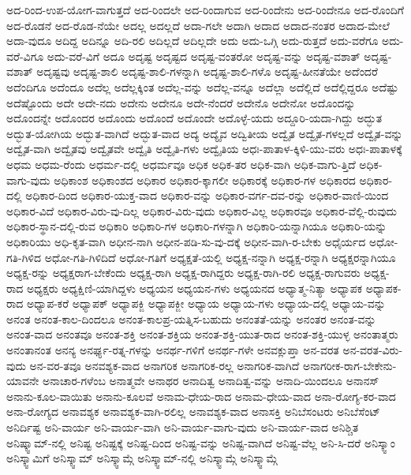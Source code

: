{ಅದ-ರಿಂದ-ಉಪ-ಯೋಗ-ವಾಗುತ್ತದೆ
ಅದ-ರಿಂದಲೇ
ಅದ-ರಿಂದಾಗುವ
ಅದ-ರಿಂದೇನು
ಅದ-ರಿಂದೇನೂ
ಅದ-ರೊಂದಿಗೆ
ಅದ-ರೊಡನೆ
ಅದ-ರೊಡ-ನೆಯೇ
ಅದಲ್ಲ
ಅದಲ್ಲದೆ
ಅದಾ-ಗಲೇ
ಅದಾಗಿ
ಅದಾದ
ಅದಾದ-ನಂತರ
ಅದಾದ-ಮೇಲೆ
ಅದಾ-ವುದೂ
ಅದಿದ್ದ
ಅದಿನ್ನೂ
ಅದಿ-ರಲಿ
ಅದಿಲ್ಲದೆ
ಅದಿಲ್ಲದೇ
ಅದು
ಅದು-ಒಗ್ಗಿ
ಅದು-ರುತ್ತದೆ
ಅದು-ವರೆಗೂ
ಅದು-ವರೆ-ವಿಗೂ
ಅದು-ವರೆ-ವಿಗೆ
ಅದೂ
ಅದೃಷ್ಟ
ಅದೃಷ್ಟದ
ಅದೃಷ್ಟ-ವಂತರೋ
ಅದೃಷ್ಟ-ವನ್ನು
ಅದೃಷ್ಟ-ವಶಾತ್
ಅದೃಷ್ಟ-ವಶಾತ್
ಅದೃಷ್ಟವು
ಅದೃಷ್ಟ-ಶಾಲಿ
ಅದೃಷ್ಟ-ಶಾಲಿ-ಗಳನ್ನಾಗಿ
ಅದೃಷ್ಟ-ಶಾಲಿ-ಗಳೊ
ಅದೃಷ್ಟ-ಹೀನತೆಯೇ
ಅದೆಂದರೆ
ಅದೆಂದಿಗೂ
ಅದೆಂದೂ
ಅದೆಲ್ಲ
ಅದೆಲ್ಲಕ್ಕಿಂತ
ಅದೆಲ್ಲ-ವನ್ನು
ಅದೆಲ್ಲ-ವನ್ನೂ
ಅದೆಲ್ಲಾ
ಅದೆಲ್ಲಿದೆ
ಅದೆಲ್ಲಿದ್ದರೂ
ಅದೆಷ್ಟು
ಅದೆಷ್ಟೊಂದು
ಅದೇ
ಅದೇ-ನದು
ಅದೇನು
ಅದೇನೂ
ಅದೇ-ನೆಂದರೆ
ಅದೇನೊ
ಅದೇನೋ
ಅದೊಂದನ್ನು
ಅದೊಂದನ್ನೇ
ಅದೊಂದರ
ಅದೊಂದು
ಅದೊಂದೆ
ಅದೊಂದೇ
ಅದೊಳ್ಳೆ-ಯದು
ಅದ್ದೂರಿ-ಯದಾ-ಗಿದ್ದು
ಅದ್ಭುತ
ಅದ್ಭುತ-ಯೋಗಿಯ
ಅದ್ಭುತ-ವಾಗಿದೆ
ಅದ್ಭುತ-ವಾದ
ಅದ್ಯ
ಅದ್ಯೈವ
ಅದ್ವಿತೀಯ
ಅದ್ವೈತ
ಅದ್ವೈತ-ಗಳಲ್ಲದೆ
ಅದ್ವೈತ-ವನ್ನು
ಅದ್ವೈತ-ವಾಗಿ
ಅದ್ವೈತವು
ಅದ್ವೈತವೇ
ಅದ್ವೈತಿ
ಅದ್ವೈತಿ-ಗಳು
ಅದ್ವೈತಿಯ
ಅಧಃ-ಪಾತಾಳ-ಕ್ಕಿಳಿ-ಯು-ವರು
ಅಧಃ-ಪಾತಾಳಕ್ಕೆ
ಅಧಮ
ಅಧಮ-ರೆಂದು
ಅಧರ್ಮ-ದಲ್ಲಿ
ಅಧರ್ಮವೂ
ಅಧಿಕ
ಅಧಿಕ-ತರ
ಅಧಿಕ-ವಾಗಿ
ಅಧಿಕ-ವಾಗು-ತ್ತಿದೆ
ಅಧಿಕ-ವಾಗು-ವುದು
ಅಧಿಕಾಂಶ
ಅಧಿಕಾಂಶದ
ಅಧಿಕಾರ
ಅಧಿಕಾರ-ಕ್ಕಾಗಲೀ
ಅಧಿಕಾರಕ್ಕೆ
ಅಧಿಕಾರ-ಗಳ
ಅಧಿಕಾರದ
ಅಧಿಕಾರ-ದಲ್ಲಿ
ಅಧಿಕಾರ-ದಿಂದ
ಅಧಿಕಾರ-ಯುಕ್ತ-ವಾದ
ಅಧಿಕಾರ-ವನ್ನು
ಅಧಿಕಾರ-ವರ್ಗ-ದವ-ರನ್ನು
ಅಧಿಕಾರ-ವಾಣಿ-ಯಿಂದ
ಅಧಿಕಾರ-ವಿದೆ
ಅಧಿಕಾರ-ವಿರು-ವು-ದಿಲ್ಲ
ಅಧಿಕಾರ-ವಿರು-ವುದು
ಅಧಿಕಾರ-ವಿಲ್ಲ
ಅಧಿಕಾರವೂ
ಅಧಿಕಾರ-ವೆಲ್ಲಿ-ರುವುದು
ಅಧಿಕಾರ-ಸ್ಥಾನ-ದಲ್ಲಿ-ರುವ
ಅಧಿಕಾರಿ
ಅಧಿಕಾರಿ-ಗಳ
ಅಧಿಕಾರಿ-ಗಳನ್ನಾಗಿ
ಅಧಿಕಾರಿ-ಯನ್ನಾಗಿಯೂ
ಅಧಿಕಾರಿ-ಯನ್ನು
ಅಧಿಕಾರಿಯು
ಅಧಿ-ಕೃತ-ವಾಗಿ
ಅಧೀನ-ನಾಗಿ
ಅಧೀನ-ಪಡಿ-ಸು-ವು-ದಕ್ಕೆ
ಅಧೀನ-ವಾಗಿ-ರ-ಬೇಕು
ಅಧೈರ್ಯದ
ಅಧೋ-ಗತಿ-ಗಿಳಿದ
ಅಧೋ-ಗತಿ-ಗಿಳಿದಿದೆ
ಅಧೋ-ಗತಿಗೆ
ಅಧ್ಯಕ್ಷತೆ-ಯಲ್ಲಿ
ಅಧ್ಯಕ್ಷ-ನನ್ನಾಗಿ
ಅಧ್ಯಕ್ಷ-ರನ್ನಾಗಿ
ಅಧ್ಯಕ್ಷರನ್ನಾಗಿಯೂ
ಅಧ್ಯಕ್ಷ-ರನ್ನು
ಅಧ್ಯಕ್ಷರಾಗ-ಬೇಕೆಂದು
ಅಧ್ಯಕ್ಷ-ರಾಗಿ
ಅಧ್ಯಕ್ಷ-ರಾಗಿದ್ದರು
ಅಧ್ಯಕ್ಷ-ರಾಗಿ-ರಲಿ
ಅಧ್ಯಕ್ಷ-ರಾಗುವರು
ಅಧ್ಯಕ್ಷ-ರಾದ
ಅಧ್ಯಕ್ಷರು
ಅಧ್ಯಕ್ಷಿಣಿ-ಯಾಗಿದ್ದಳು
ಅಧ್ಯಯನ
ಅಧ್ಯಯನ-ಗಳು
ಅಧ್ಯಯನದ
ಅಧ್ಯಾತ್ಮ-ನಿತ್ಯಾ
ಅಧ್ಯಾಪಕ
ಅಧ್ಯಾಪಕ-ರಾದ
ಅಧ್ಯಾಪ-ಕರೆ
ಅಧ್ಯಾಪಕ್
ಅಧ್ಯಾಪಕ್ಜಿ
ಅಧ್ಯಾಪಕ್ಜೀ
ಅಧ್ಯಾಯ
ಅಧ್ಯಾಯ-ಗಳು
ಅಧ್ಯಾಯ-ದಲ್ಲಿ
ಅಧ್ಯಾಯ-ವನ್ನು
ಅನಂತ
ಅನಂತ-ಕಾಲ-ದಿಂದಲೂ
ಅನಂತ-ಕಾಲಪ್ರ-ಯತ್ನಿಸ-ಬಹುದು
ಅನಂತತೆ-ಯನ್ನು
ಅನಂತರ
ಅನಂತ-ವನ್ನು
ಅನಂತ-ವಾದ
ಅನಂತವೂ
ಅನಂತ-ಶಕ್ತಿ
ಅನಂತ-ಶಕ್ತಿಯ
ಅನಂತ-ಶಕ್ತಿ-ಯುತ-ರಾದ
ಅನಂತ-ಶಕ್ತಿ-ಯುಳ್ಳ
ಅನಂತಾತ್ಮರು
ಅನಂತಾನಂತ
ಅನನ್ಯ
ಅನರ್ಘ್ಯ-ರತ್ನ-ಗಳನ್ನು
ಅನರ್ಥ-ಗಳಿಗೆ
ಅನರ್ಥ-ಗಳೇ
ಅನವಕ್ಲುಪ್ತಾ
ಅನ-ವರತ
ಅನ-ವರತ-ವಿರು-ವುದು
ಅನ-ವರ-ತವೂ
ಅನವಶ್ಯಕ-ವಾದ
ಅನಾಗರಿಕ
ಅನಾಗರಿಕ-ರಲ್ಲ
ಅನಾಗರಿಕ-ವಾಗಿದೆ
ಅನಾಗರೀಕ-ರಾಗ-ಬೇಕೇನು-ಯಾವನೇ
ಅನಾಚಾರ-ಗಳೆಂಬ
ಅನಾತ್ಮವೇ
ಅನಾಥರ
ಅನಾದಿತ್ವ
ಅನಾದಿತ್ವ-ವನ್ನು
ಅನಾದಿ-ಯಿಂದಲೂ
ಅನಾನಸ್
ಅನಾನು-ಕೂಲ-ವಾಯಿತು
ಅನಾನು-ಕೂಲವೆ
ಅನಾಮ-ಧೇಯ-ರಾದ
ಅನಾಮ-ಧೇಯ-ವಾದ
ಅನಾ-ರೋಗ್ಯ-ಕರ-ವಾದ
ಅನಾ-ರೋಗ್ಯದ
ಅನಾವಶ್ಯಕ
ಅನಾವಶ್ಯಕ-ವಾಗಿ-ರಲಿಲ್ಲ
ಅನಾವಶ್ಯಕ-ವಾದ
ಅನಾಸಕ್ತಿ
ಅನಿಬೆಸಂಟರು
ಅನಿಬೆಸೆಂಟ್
ಅನಿರ್ದಿಷ್ಟ
ಅನಿ-ವಾರ್ಯ
ಅನಿ-ವಾರ್ಯ-ವಾಗಿ
ಅನಿ-ವಾರ್ಯ-ವಾಗು-ವುದು
ಅನಿ-ವಾರ್ಯ-ವಾದ
ಅನಿಶ್ಚಿತ
ಅನಿಷ್ಕ್ವಾಮ್-ನಲ್ಲಿ
ಅನಿಷ್ಟ
ಅನಿಷ್ಟಕ್ಕೆ
ಅನಿಷ್ಟ-ದಿಂದ
ಅನಿಷ್ಟ-ವನ್ನು
ಅನಿಷ್ಟ-ವಾಗಿದೆ
ಅನಿಷ್ಟ-ವೆಲ್ಲ
ಅನಿ-ಸಿ-ದರೆ
ಅನಿಸ್ಕ್ವಾಂ
ಅನಿಸ್ಕ್ವಾಮಿಗೆ
ಅನಿಸ್ಕ್ವಾಮ್
ಅನಿಸ್ಕ್ವಾಮ್ಗೆ
ಅನಿಸ್ಕ್ವಾಮ್-ನಲ್ಲಿ
ಅನಿಸ್ಕ್ವಾಮ್ಗೆ
ಅನಿಸ್ಕ್ವಾಮ್ಗೆ
}
